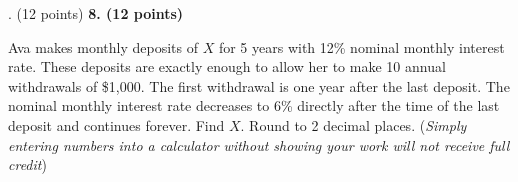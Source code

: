 \documentclass[12pt]{article}
\makeatletter
\newenvironment{problem}[1][]{%
  \bigskip%
  \noindent\begin{boxedminipage}{\columnwidth}%
  \def\@tempa{#1}%
  \ifx\@tempa\empty\else%
    \textbf{#1}\hspace{0.5em}%
  \fi%
}{%
  \end{boxedminipage}%
}
\makeatother
\begin{document}
\newpage

\newpage
\begin{problem}[8. (12 points)]
Ava makes monthly deposits of $X$ for 5 years with 12\% nominal monthly interest rate. These deposits are exactly enough to allow her to make 10 annual withdrawals of \$1,000. The first withdrawal is one year after the last deposit. The nominal monthly interest rate decreases to 6\% directly after the time of the last deposit and continues forever. Find $X$. Round to 2 decimal places. (\textit{Simply entering numbers into a calculator without showing your work will not receive full credit})
\end{problem}
\end{document}
